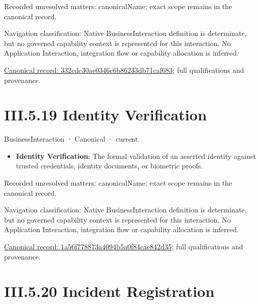 {\small Recorded unresolved matters: canonicalName; exact scope remains in the canonical record.}\par
{\small Navigation classification: Native BusinessInteraction definition is determinate, but no governed capability context is represented for this interaction. No Application Interaction, integration flow or capability allocation is inferred.}\par
{\footnotesize \href{../../../../../../../../continuum/business/business-interaction/332cdc30ae0346c6b86233db71caf683.md}{Canonical record: 332cdc30ae0346c6b86233db71caf683}; full qualifications and provenance.}\par
\section*{III.5.19 Identity Verification}
\label{navigation:III.5.19}

\label{element:1a56f778873a4094b5a0f84cae842d35}
{\small BusinessInteraction · Canonical · current}\par

\begin{itemize}


\item \textbf{Identity Verification}: The formal validation of an asserted identity against trusted credentials, identity documents, or biometric proofs.

\end{itemize}

{\small Recorded unresolved matters: canonicalName; exact scope remains in the canonical record.}\par
{\small Navigation classification: Native BusinessInteraction definition is determinate, but no governed capability context is represented for this interaction. No Application Interaction, integration flow or capability allocation is inferred.}\par
{\footnotesize \href{../../../../../../../../continuum/business/business-interaction/1a56f778873a4094b5a0f84cae842d35.md}{Canonical record: 1a56f778873a4094b5a0f84cae842d35}; full qualifications and provenance.}\par
\section*{III.5.20 Incident Registration}
\label{navigation:III.5.20}

